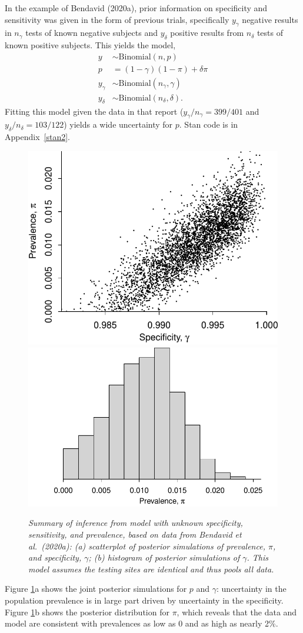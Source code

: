 \documentclass[11pt]{article}
\begin{document}
In the example of Bendavid (2020a), prior information on specificity and sensitivity was given in the form of previous trials, specifically $y_{\gamma}$ negative results in $n_{\gamma}$ tests of known negative subjects and $y_{\delta}$ positive results from $n_{\delta}$ tests of known positive subjects.  This yields the model,
  \begin{align*}
   y & \sim \mbox{Binomial} (n, p)\\
  p & = (1-\gamma)(1- \pi)+ \delta\pi\\
   y_{\gamma} & \sim \mbox{Binomial} (n_{\gamma}, \gamma)\\
   y_{\delta} & \sim \mbox{Binomial} (n_{\delta}, \delta).
 \end{align*}
 Fitting this model given the data in that report ($y_{\gamma}/n_{\gamma}=399/401$ and $y_{\delta}/n_{\delta}=103/122$) yields a wide uncertainty for $p$.  Stan code is in Appendix~\ref{stan2}.

\begin{figure}
\centerline{ \includegraphics[width=.45\textwidth]{scatter.pdf} \includegraphics[width=.55\textwidth]{hist.pdf}}
\caption{\em Summary of inference from model with unknown specificity, sensitivity, and prevalence, based on data from Bendavid et al.\ (2020a):  (a) scatterplot of posterior simulations of prevalence, $\pi$, and specificity, $\gamma$; (b) histogram of posterior simulations of $\gamma$.  This model assumes the testing sites are identical and thus pools all data.}
\label{posterior1}
\end{figure}

Figure \ref{posterior1}a shows the joint posterior simulations for $p$ and $\gamma$:  uncertainty in the population prevalence is in large part driven by uncertainty in the specificity.  Figure \ref{posterior1}b shows the posterior distribution for $\pi$, which reveals that the data and model are consistent with prevalences as low as 0 and as high as nearly 2\%.
\end{document}

